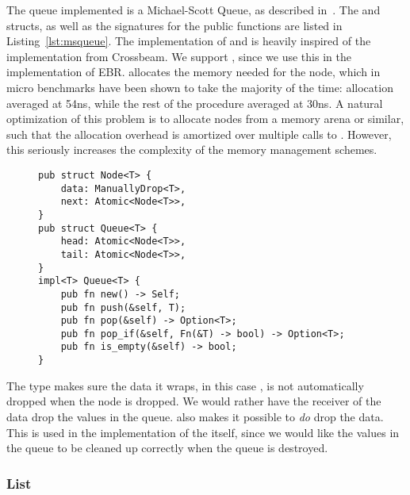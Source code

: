 \documentclass[b5paper]{report}
\begin{document}
The queue implemented is a Michael-Scott Queue, as described
in~\cite{michael1996simple}. The  and  structs, as well
as the signatures for the public functions are listed in
Listing~\ref{lst:msqueue}. The implementation of  and  is
heavily inspired of the implementation from Crossbeam.  We support
, since we use this in the implementation of EBR.  
allocates the memory needed for the node, which in micro benchmarks have been
shown to take the majority of the time: allocation averaged at 54ns, while the
rest of the procedure averaged at 30ns.  A natural optimization of this problem
is to allocate nodes from a memory arena or similar, such that the allocation
overhead is amortized over multiple calls to . However, this
seriously increases the complexity of the memory management schemes.

\begin{figure}[ht]
\begin{lstlisting}[caption=Structs for the Michael-Scott Queue,label=lst:msqueue]
pub struct Node<T> {
    data: ManuallyDrop<T>,
    next: Atomic<Node<T>>,
}
pub struct Queue<T> {
    head: Atomic<Node<T>>,
    tail: Atomic<Node<T>>,
}
impl<T> Queue<T> {
    pub fn new() -> Self;
    pub fn push(&self, T);
    pub fn pop(&self) -> Option<T>;
    pub fn pop_if(&self, Fn(&T) -> bool) -> Option<T>;
    pub fn is_empty(&self) -> bool;
}
\end{lstlisting}
\end{figure}

The  type makes sure the data it wraps, in this case
, is not automatically dropped when the node is dropped. We would rather
have the receiver of the data drop the values in the queue. 
also makes it possible to \emph{do} drop the data. This is used in the
 implementation of the  itself, since we would like the
values in the queue to be cleaned up correctly when the queue is destroyed.

\subsubsection{List\label{sec:impl-list}}
\end{document}
